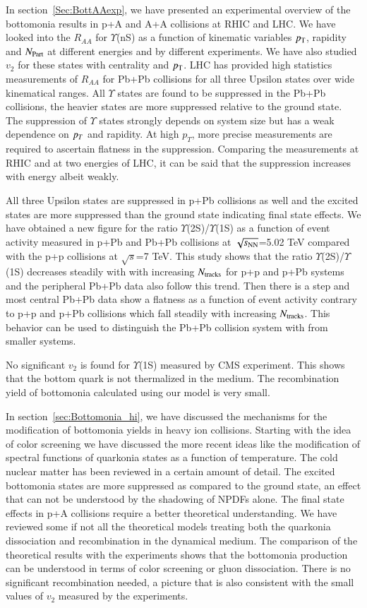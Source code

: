 In section~\ref{Sec:BottAAexp}, we have presented an experimental overview of the bottomonia
results in p+A and A+A collisions at RHIC and LHC. We have looked into the
$R_{AA}$ for $\Upsilon$(nS) as a function of kinematic variables 
$p_{\rm T}$, rapidity and $N_{\rm Part}$ at different energies and by different experiments. 
We have also studied $v_2$ for these states with centrality and $p_{\rm T}$.
LHC has provided high statistics measurements of $R_{AA}$ for
Pb+Pb collisions for all three Upsilon states over wide kinematical ranges.
All $\Upsilon$ states are found to be suppressed in the Pb+Pb collisions,
the heavier states are more suppressed relative to the ground state.
The suppression of $\Upsilon$ states strongly depends on system size but
has a weak dependence on $p_{T}$ and rapidity. At high $p_T$, more precise
measurements are required to ascertain flatness in the suppression. 
Comparing the measurements at RHIC and at two energies of LHC, it can be
said that the suppression increases with energy albeit weakly.

All three Upsilon states are suppressed in p+Pb collisions as well
and the excited states are more suppressed than the ground state indicating
final state effects.
We have obtained a new figure for the ratio $\Upsilon$(2S)/$\Upsilon$(1S)
as a function of event activity measured in p+Pb and Pb+Pb collisions at
$\sqrt{s_{\rm NN}}$=5.02 TeV compared with the 
p+p collisions at $\sqrt{s}$=7 TeV. This study shows 
that the ratio $\Upsilon$(2S)/$\Upsilon$(1S) decreases steadily
with with increasing $N_{\rm tracks}$ for
p+p and p+Pb systems and the peripheral Pb+Pb data also follow this trend.
Then there is a step and most central Pb+Pb
data show a flatness as a function of event activity contrary to p+p and
p+Pb collisions which fall steadily with increasing $N_{\rm tracks}$.
This behavior can be used to distinguish the Pb+Pb collision
system with from smaller systems.
 
No significant $v_2$ is found for $\Upsilon$(1S) measured by CMS
experiment. This shows that the bottom quark is not thermalized in the medium.
The recombination yield of bottomonia calculated using our model
is very small. 


In section~\ref{sec:Bottomonia_hi}, we have discussed the mechanisms for the modification of 
bottomonia yields in heavy ion collisions. Starting with the idea of color screening we have
discussed the more recent ideas like the modification of spectral functions of quarkonia states as
a function of temperature.
The cold nuclear matter has been reviewed in a certain amount of detail.
The excited bottomonia states are more suppressed as compared to the ground state,
an effect that can not be understood by the shadowing of NPDFs alone. The final state
effects in p+A collisions require a better theoretical understanding. 
We have reviewed some if not all the theoretical models treating both
the quarkonia dissociation and recombination in the dynamical medium.
The comparison of the theoretical results with the experiments shows that
the bottomonia production can be understood in terms of color screening
or gluon dissociation. There is no significant recombination needed,
a picture that is also consistent with the small values of $v_2$ measured
by the experiments.

 

